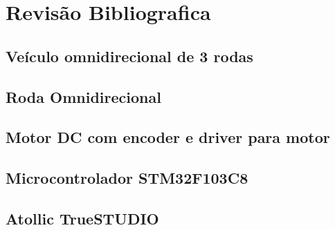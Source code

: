 
\chapter{Revisão Bibliografica}

\section{Veículo omnidirecional de 3 rodas}


\section{Roda Omnidirecional}


\section{Motor DC com encoder e driver para motor}


\section{Microcontrolador STM32F103C8}


\section{Atollic TrueSTUDIO}


